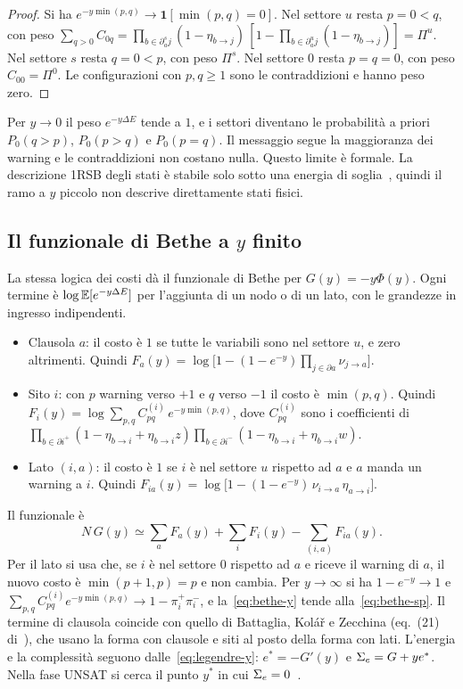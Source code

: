\begin{proof}
Si ha $e^{-y\min(p,q)}\to\mathbf 1[\min(p,q)=0]$.
Nel settore $u$ resta $p=0<q$, con peso $\sum_{q>0}C_{0q}=\prod_{b\in\partial^s_aj}(1-\eta_{b\to j})\,[1-\prod_{b\in\partial^u_aj}(1-\eta_{b\to j})]=\Pi^u$.
Nel settore $s$ resta $q=0<p$, con peso $\Pi^s$.
Nel settore $0$ resta $p=q=0$, con peso $C_{00}=\Pi^0$.
Le configurazioni con $p,q\ge1$ sono le contraddizioni e hanno peso zero.
\end{proof}

Per $y\to0$ il peso $e^{-y\Delta E}$ tende a $1$, e i settori diventano le probabilità a priori $P_0(q>p)$, $P_0(p>q)$ e $P_0(p=q)$.
Il messaggio segue la maggioranza dei warning e le contraddizioni non costano nulla.
Questo limite è formale.
La descrizione 1RSB degli stati è stabile solo sotto una energia di soglia~\citep{montanari2004instability}, quindi il ramo a $y$ piccolo non descrive direttamente stati fisici.

\subsection{Il funzionale di Bethe a $y$ finito}

La stessa logica dei costi dà il funzionale di Bethe per $G(y)=-y\Phi(y)$.
Ogni termine è $\log\mathbb{E}[e^{-y\Delta E}]$ per l'aggiunta di un nodo o di un lato, con le grandezze in ingresso indipendenti.
\begin{itemize}
\item Clausola $a$: il costo è $1$ se tutte le variabili sono nel settore $u$, e zero altrimenti. Quindi $F_a(y)=\log\bigl[1-(1-e^{-y})\prod_{j\in\partial a}\nu_{j\to a}\bigr]$.
\item Sito $i$: con $p$ warning verso $+1$ e $q$ verso $-1$ il costo è $\min(p,q)$. Quindi $F_i(y)=\log\sum_{p,q}C^{(i)}_{pq}\,e^{-y\min(p,q)}$, dove $C^{(i)}_{pq}$ sono i coefficienti di $\prod_{b\in\partial i^+}(1-\eta_{b\to i}+\eta_{b\to i}z)\prod_{b\in\partial i^-}(1-\eta_{b\to i}+\eta_{b\to i}w)$.
\item Lato $(i,a)$: il costo è $1$ se $i$ è nel settore $u$ rispetto ad $a$ e $a$ manda un warning a $i$. Quindi $F_{ia}(y)=\log\bigl[1-(1-e^{-y})\,\nu_{i\to a}\,\eta_{a\to i}\bigr]$.
\end{itemize}
Il funzionale è
\begin{equation}
N\,G(y)\simeq\sum_aF_a(y)+\sum_iF_i(y)-\sum_{(i,a)}F_{ia}(y).
\label{eq:bethe-y}
\end{equation}
Per il lato si usa che, se $i$ è nel settore $0$ rispetto ad $a$ e riceve il warning di $a$, il nuovo costo è $\min(p+1,p)=p$ e non cambia.
Per $y\to\infty$ si ha $1-e^{-y}\to1$ e $\sum_{p,q}C^{(i)}_{pq}e^{-y\min(p,q)}\to1-\pi_i^+\pi_i^-$, e la~\eqref{eq:bethe-y} tende alla~\eqref{eq:bethe-sp}.
Il termine di clausola coincide con quello di Battaglia, Kolář e Zecchina (eq.~(21) di~\citep{battaglia2004minimizing}), che usano la forma con clausole e siti al posto della forma con lati.
L'energia e la complessità seguono dalle~\eqref{eq:legendre-y}: $e^*=-G'(y)$ e $\Sigma_e=G+ye^*$.
Nella fase UNSAT si cerca il punto $y^*$ in cui $\Sigma_e=0$~\citep{mezard2002random,battaglia2004minimizing}.

